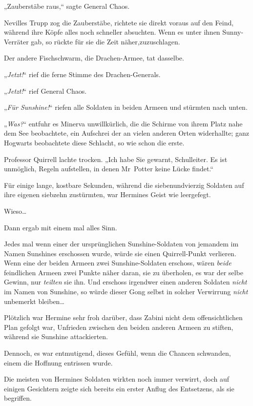 {„Zauberstäbe raus,“ sagte General Chaos.

Nevilles Trupp zog die Zauberstäbe, richtete sie direkt voraus auf den Feind, während ihre Köpfe alles noch schneller absuchten. Wenn es unter ihnen Sunny-Verräter gab, so rückte für sie die Zeit näher,zuzuschlagen.

Der andere Fischschwarm, die Drachen-Armee, tat dasselbe.

„\emph{Jetzt!}“ rief die ferne Stimme des Drachen-Generals.

„\emph{Jetzt!}“ rief General Chaos.

„\emph{Für Sunshine!}“ riefen alle Soldaten in beiden Armeen und stürmten nach unten.

\later

„\emph{Was?}“ entfuhr es Minerva unwillkürlich, die die Schirme von ihrem Platz nahe dem See beobachtete, ein Aufschrei der an vielen anderen Orten widerhallte; ganz Hogwarts beobachtete diese Schlacht, so wie schon die erste.

Professor Quirrell lachte trocken. „Ich habe Sie gewarnt, Schulleiter. Es ist unmöglich, Regeln aufstellen, in denen Mr~Potter keine Lücke findet.“

\later

Für einige lange, kostbare Sekunden, während die siebenundvierzig Soldaten auf ihre eigenen siebzehn zustürmten, war Hermines Geist wie leergefegt.

Wieso…

Dann ergab mit einem mal alles Sinn.

Jedes mal wenn einer der ursprünglichen Sunshine-Soldaten von jemandem im Namen Sunshines erschossen wurde, würde sie einen Quirrell-Punkt verlieren. Wenn eine der beiden Armeen zwei Sunshine-Soldaten erschoss, wären \emph{beide} feindlichen Armeen zwei Punkte näher daran, sie zu überholen, es war der selbe Gewinn, nur \emph{teilten} sie ihn. Und erschoss irgendwer einen anderen Soldaten \emph{nicht} im Namen von Sunshine, so würde dieser Gong selbst in solcher Verwirrung \emph{nicht} unbemerkt bleiben…

Plötzlich war Hermine sehr froh darüber, dass Zabini nicht dem offensichtlichen Plan gefolgt war, Unfrieden zwischen den beiden anderen Armeen zu stiften, während sie Sunshine attackierten.

Dennoch, es war entmutigend, dieses Gefühl, wenn die Chancen schwanden, einem die Hoffnung entrissen wurde.

Die meisten von Hermines Soldaten wirkten noch immer verwirrt, doch auf einigen Gesichtern zeigte sich bereits ein erster Anflug des Entsetzens, als sie begriffen.

}
